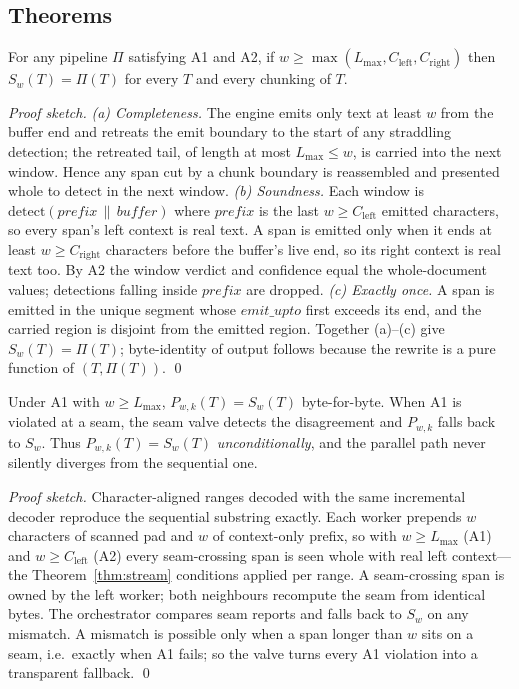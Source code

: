 \documentclass[runningheads]{llncs}
\newcommand{\T}{T}
\newcommand{\Pipe}{\Pi}
\newcommand{\Sw}{S_{w}}
\newcommand{\Pwk}{P_{w,k}}
\newcommand{\Lmax}{L_{\max}}
\newcommand{\Cleft}{C_{\mathrm{left}}}
\newcommand{\Cright}{C_{\mathrm{right}}}
\begin{document}
\subsection{Theorems}

\begin{theorem}
\label{thm:stream}
For any pipeline $\Pipe$ satisfying A1 and A2, if $w \ge
\max(\Lmax,\Cleft,\Cright)$ then $\Sw(\T)=\Pipe(\T)$ for every $\T$ and every
chunking of $\T$.
\end{theorem}

\begin{proof}[Proof sketch]
\emph{(a) Completeness.} The engine emits only text at least $w$ from the buffer
end and retreats the emit boundary to the start of any straddling detection; the
retreated tail, of length at most $\Lmax\le w$, is carried into the next window.
Hence any span cut by a chunk boundary is reassembled and presented whole to
$\mathrm{detect}$ in the next window.
\emph{(b) Soundness.} Each window is $\mathrm{detect}(\mathit{prefix}\,\|\,
\mathit{buffer})$ where $\mathit{prefix}$ is the last $w\ge\Cleft$ emitted
characters, so every span's left context is real text. A span is emitted only
when it ends at least $w\ge\Cright$ characters before the buffer's live end, so
its right context is real text too. By A2 the window verdict and confidence equal
the whole-document values; detections falling inside $\mathit{prefix}$ are
dropped.
\emph{(c) Exactly once.} A span is emitted in the unique segment whose
$\mathit{emit\_upto}$ first exceeds its end, and the carried region is disjoint
from the emitted region.
Together (a)--(c) give $\Sw(\T)=\Pipe(\T)$; byte-identity of output follows
because the rewrite is a pure function of $(\T,\Pipe(\T))$. \qed
\end{proof}

\begin{theorem}
\label{thm:par}
Under A1 with $w\ge\Lmax$, $\Pwk(\T)=\Sw(\T)$ byte-for-byte. When A1 is violated
at a seam, the seam valve detects the disagreement and $\Pwk$ falls back to
$\Sw$. Thus $\Pwk(\T)=\Sw(\T)$ \emph{unconditionally}, and the parallel path never
silently diverges from the sequential one.
\end{theorem}

\begin{proof}[Proof sketch]
Character-aligned ranges decoded with the same incremental decoder reproduce the
sequential substring exactly. Each worker prepends $w$ characters of scanned pad
and $w$ of context-only prefix, so with $w\ge\Lmax$ (A1) and $w\ge\Cleft$ (A2)
every seam-crossing span is seen whole with real left context---the
Theorem~\ref{thm:stream} conditions applied per range. A seam-crossing span is
owned by the left worker; both neighbours recompute the seam from identical
bytes. The orchestrator compares seam reports and falls back to $\Sw$ on any
mismatch. A mismatch is possible only when a span longer than $w$ sits on a seam,
i.e.\ exactly when A1 fails; so the valve turns every A1 violation into a
transparent fallback. \qed
\end{proof}
\end{document}
